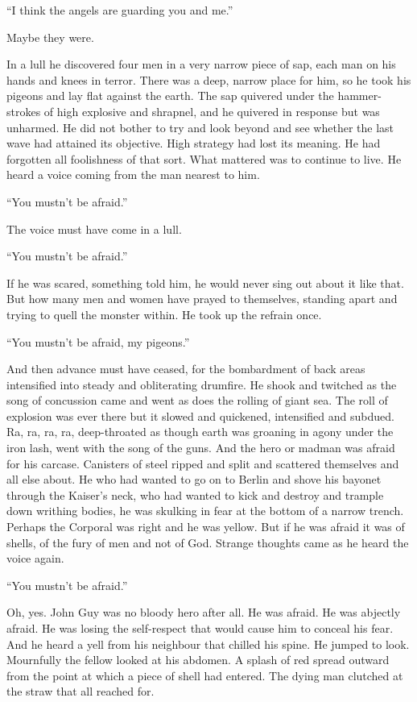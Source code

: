 ``I think the angels are guarding you and me.''

Maybe they were.

In a lull he discovered four men in a very narrow piece of sap, each man on his hands and knees in terror. There was a deep, narrow place for him, so he took his pigeons and lay flat against the earth. The sap quivered under the hammer-strokes of high explosive and shrapnel, and he quivered in response but was unharmed. He did not bother to try and look beyond and see whether the last wave had attained its objective. High strategy had lost its meaning. He had forgotten all foolishness of that sort. What mattered was to continue to live. He heard a voice coming from the man nearest to him.

``You mustn't be afraid.''

The voice must have come in a lull.

``You mustn't be afraid.''

If he was scared, something told him, he would never sing out about it like that. But how many men and women have prayed to themselves, standing apart and trying to quell the monster within. He took up the refrain once.

``You mustn't be afraid, my pigeons.''

And then advance must have ceased, for the bombardment of back areas intensified into steady and obliterating drumfire. He shook and twitched as the song of concussion came and went as does the rolling of giant sea. The roll of explosion was ever there but it slowed and quickened, intensified and subdued. Ra, ra, ra, ra, deep-throated as though earth was groaning in agony under the iron lash, went with the song of the guns. And the hero or madman was afraid for his carcase. Canisters of steel ripped and split and scattered themselves and all else about. He who had wanted to go on to Berlin and shove his bayonet through the Kaiser's neck, who had wanted to kick and destroy and trample down writhing bodies, he was skulking in fear at the bottom of a narrow trench. Perhaps the Corporal was right and he was yellow. But if he was afraid it was of shells, of the fury of men and not of God. Strange thoughts came as he heard the voice again.

``You mustn't be afraid.''

Oh, yes. John Guy was no bloody hero after all. He was afraid. He was abjectly afraid. He was losing the self-respect that would cause him to conceal his fear. And he heard a yell from his neighbour that chilled his spine. He jumped to look. Mournfully the fellow looked at his abdomen. A splash of red spread outward from the point at which a piece of shell had entered. The dying man clutched at the straw that all reached for.

